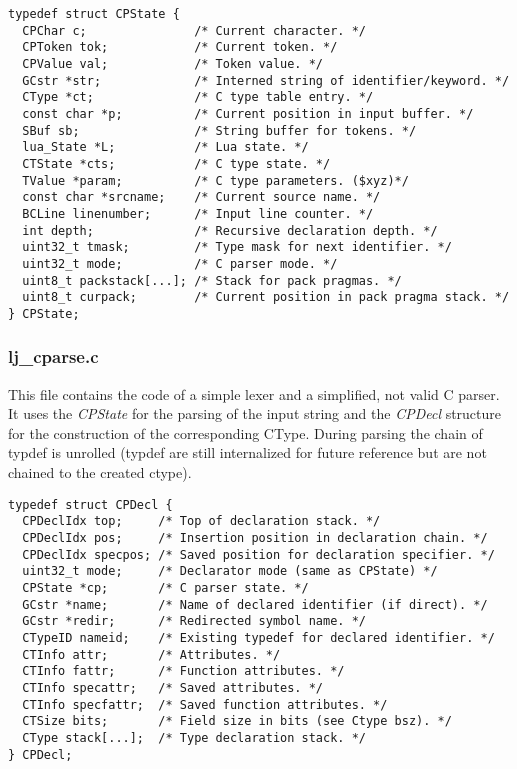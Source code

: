 \begin{lstlisting}[style=CStyle]
typedef struct CPState {
  CPChar c;               /* Current character. */
  CPToken tok;            /* Current token. */
  CPValue val;            /* Token value. */
  GCstr *str;             /* Interned string of identifier/keyword. */
  CType *ct;              /* C type table entry. */
  const char *p;          /* Current position in input buffer. */
  SBuf sb;                /* String buffer for tokens. */
  lua_State *L;           /* Lua state. */
  CTState *cts;           /* C type state. */
  TValue *param;          /* C type parameters. ($xyz)*/
  const char *srcname;    /* Current source name. */
  BCLine linenumber;      /* Input line counter. */
  int depth;              /* Recursive declaration depth. */
  uint32_t tmask;         /* Type mask for next identifier. */
  uint32_t mode;          /* C parser mode. */
  uint8_t packstack[...]; /* Stack for pack pragmas. */
  uint8_t curpack;        /* Current position in pack pragma stack. */
} CPState;
\end{lstlisting}

\subsubsection{lj\_cparse.c}
This file contains the code of a simple lexer and a simplified, not valid C parser. It uses the \emph{CPState} for the parsing of the input
string and the \emph{CPDecl} structure for the construction of the
corresponding CType. During parsing the chain of typdef is unrolled (typdef are
still internalized for future reference but are not chained to the created
ctype).

\begin{lstlisting}[style=CStyle]
typedef struct CPDecl {
  CPDeclIdx top;     /* Top of declaration stack. */
  CPDeclIdx pos;     /* Insertion position in declaration chain. */
  CPDeclIdx specpos; /* Saved position for declaration specifier. */
  uint32_t mode;     /* Declarator mode (same as CPState) */
  CPState *cp;       /* C parser state. */
  GCstr *name;       /* Name of declared identifier (if direct). */
  GCstr *redir;      /* Redirected symbol name. */
  CTypeID nameid;    /* Existing typedef for declared identifier. */
  CTInfo attr;       /* Attributes. */
  CTInfo fattr;      /* Function attributes. */
  CTInfo specattr;   /* Saved attributes. */
  CTInfo specfattr;  /* Saved function attributes. */
  CTSize bits;       /* Field size in bits (see Ctype bsz). */
  CType stack[...];  /* Type declaration stack. */
} CPDecl;
\end{lstlisting}

